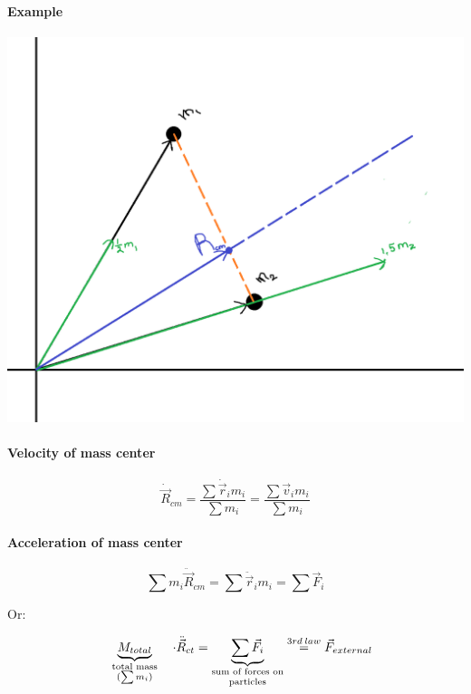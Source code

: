 \paragraph{Example}
 	\begin{center}
 		\includegraphics[width=\linewidth]{./lect12/pic1.png}
 	\end{center}
 	
 	\paragraph{Velocity of mass center}
 	
 $$	\dot{\vec{R}}_{cm} = \frac{\sum{\dot{\vec{r}}_i m_i}}{\sum m_i} = \frac{\sum \vec{v}_i m_i}{\sum m_i}$$
 \paragraph{Acceleration of mass center}
 $$	\sum{m_i}\ddot{\vec{R}}_{cm} = \sum{\ddot{\vec{r}}_i m_i} = \sum \vec{F}_i$$
 
 Or:
 
 $$\underbrace{M_{total} }_{\parbox{2cm}{\centering \scriptsize total mass ($\sum m_i$)}} \cdot \ddot{\vec{R}}_{ct} = \underbrace{\sum \vec{F}_i}_{\parbox{2cm}{\centering \scriptsize sum of forces on particles}} \stackrel{3rd \: law}{=} \vec{F}_{external}$$
 
